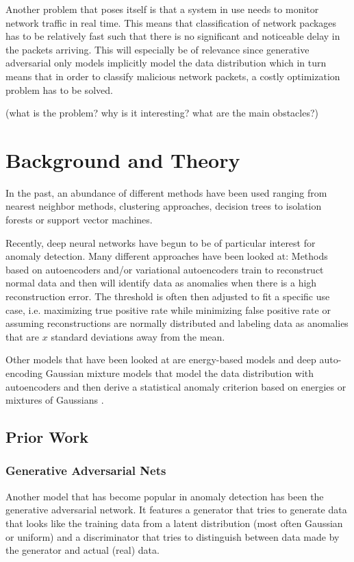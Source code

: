 \documentclass[]{article}
\begin{document}
	\noindent
	Another problem that poses itself is that a system in use needs to monitor network traffic in real time. This means that classification of network packages has to be relatively fast such that there is no significant and noticeable delay in the packets arriving. This will especially be of relevance since generative adversarial only models implicitly model the data distribution which in turn means that in order to classify malicious network packets, a costly optimization problem has to be solved.
	
	(what is the problem? why is it interesting? what are the main obstacles?)
	
	\section{Background and Theory}

	
	 In the past, an abundance of different methods have been used ranging from nearest neighbor methods, clustering approaches, decision trees to isolation forests or support vector machines. 
	 
	 Recently, deep neural networks have begun to be of particular interest for anomaly detection. Many different approaches have been looked at: Methods based on autoencoders and/or variational autoencoders train to reconstruct normal data and then will identify data as anomalies when there is a high reconstruction error. The threshold is often then adjusted to fit a specific use case, i.e. maximizing true positive rate while minimizing false positive rate or assuming reconstructions are normally distributed and labeling data as anomalies that are $x$ standard deviations away from the mean. 
	 
	 Other models that have been looked at are energy-based models and deep auto-encoding Gaussian mixture models that model the data distribution with autoencoders and then derive a statistical anomaly criterion based on energies or mixtures of Gaussians \cite{https://doi.org/10.48550/arxiv.1812.02288}. 
	
	 \subsection{Prior Work}
	 
	 \subsubsection{Generative Adversarial Nets}
	 Another model that has become popular in anomaly detection has been the generative adversarial network. It features a generator that tries to generate data that looks like the training data from a latent distribution (most often Gaussian or uniform) and a discriminator that tries to distinguish between data made by the generator and actual (real) data. 
	 
\end{document}
